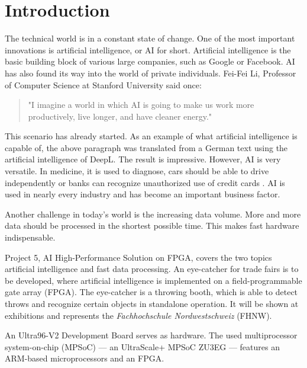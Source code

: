 \section{Introduction}
\label{sec:introduction}
The technical world is in a constant state of change. One of the most important innovations is artificial intelligence, or AI for short.
Artificial intelligence is the basic building block of various large companies, such as Google or Facebook.
AI has also found its way into the world of private individuals.
Fei-Fei Li, Professor of Computer Science at Stanford University said once:
\begin{quote}
	"I imagine a world in which AI is going to make us work more productively, live longer, and have cleaner energy."\cite{quotes_future}
\end{quote}
This scenario has already started. As an example of what artificial intelligence is capable of, the above paragraph was translated from a German text using the artificial intelligence of DeepL. The result is impressive.
However, AI is very versatile. In medicine, it is used to diagnose, cars should be able to drive independently or banks can recognize unauthorized use of credit cards \cite{artificial_intelligence_a_modern_approach}.
AI is used in nearly every industry and has become an important business factor.

Another challenge in today's world is the increasing data volume. More and more data should be processed in the shortest possible time. This makes fast hardware indispensable.

Project 5, AI High-Performance Solution on FPGA, covers the two topics artificial intelligence and fast data processing.
An eye-catcher for trade fairs is to be developed, where artificial intelligence is implemented on a field-programmable gate array (FPGA).
The eye-catcher is a throwing booth, which is able to detect throws and recognize certain objects in standalone operation.
It will be shown at exhibitions and represents the \textit{Fachhochschule Nordwestschweiz} (FHNW).

An Ultra96-V2 Development Board serves as hardware.
The used multiprocessor system-on-chip (MPSoC) --- an UltraScale+ MPSoC ZU3EG --- features an ARM-based microprocessors and an FPGA.

